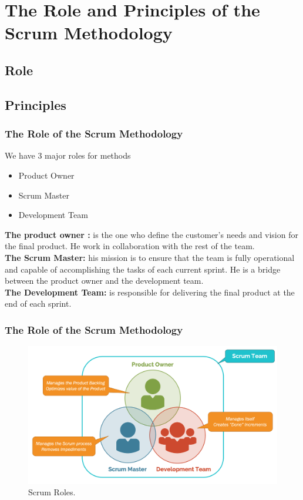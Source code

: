 \documentclass[
	11pt, %
]{beamer}
\begin{document}

\section{The Role and Principles of the Scrum Methodology}
\subsection{Role}
\subsection{Principles}

\begin{frame}
	\frametitle{The Role of the Scrum Methodology}
	We have 3 major roles for methods 
	\begin{itemize}
		\item Product Owner
		\item Scrum Master
		\item Development Team
	\end{itemize}
	\textbf{The product owner :} is the one who define the customer's needs and 
	vision for the final product. He work in collaboration with the rest of the team.
	\\
	\textbf{The Scrum Master:} his mission is to ensure that the team is fully operational and capable
	of accomplishing the tasks of each current sprint. He is a bridge between the product owner and the development team.
	\\
	\textbf{The Development Team:} is responsible for delivering the final 
	product at the end of each sprint.
\end{frame}

\begin{frame}
	\frametitle{The Role of the Scrum Methodology}
	\begin{figure}
		\includegraphics[width=0.8\linewidth]{Role.png}
		\caption{Scrum Roles.}
	\end{figure}
\end{frame}
\end{document}
